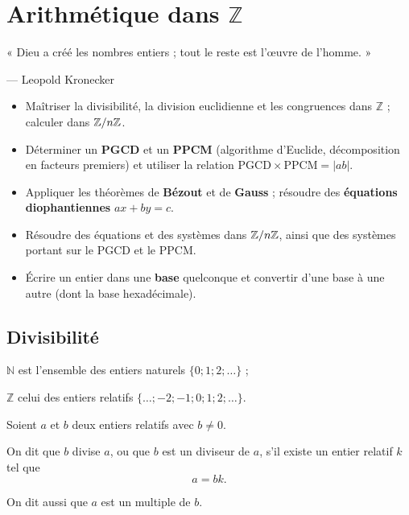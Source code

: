 \chapter{Arithmétique dans $\mathbb{Z}$}

\begin{citationchapitre}
	« Dieu a créé les nombres entiers ; tout le reste est l'œuvre de l'homme. »

	--- Leopold Kronecker
\end{citationchapitre}

\begin{objectifs}
	\begin{itemize}[label=\textbullet]
		\item Maîtriser la divisibilité, la division euclidienne et les
		congruences dans $\mathbb{Z}$ ; calculer dans $\mathbb{Z}/n\mathbb{Z}$.
		\item Déterminer un \textbf{PGCD} et un \textbf{PPCM} (algorithme
		d'Euclide, décomposition en facteurs premiers) et utiliser la relation
		$\mathrm{PGCD}\times\mathrm{PPCM} = |ab|$.
		\item Appliquer les théorèmes de \textbf{Bézout} et de \textbf{Gauss} ;
		résoudre des \textbf{équations diophantiennes} $ax + by = c$.
		\item Résoudre des équations et des systèmes dans $\mathbb{Z}/n\mathbb{Z}$, ainsi que
		des systèmes portant sur le PGCD et le PPCM.
		\item Écrire un entier dans une \textbf{base} quelconque et convertir
		d'une base à une autre (dont la base hexadécimale).
	\end{itemize}
\end{objectifs}


\section{Divisibilité}
$\mathbb N$ est l'ensemble des entiers naturels
$\{0;1;2;\ldots\}$ ;

$\mathbb Z$ celui des entiers relatifs
$\{\ldots;-2;-1;0;1;2;\ldots\}$.
	\begin{definition}

		Soient $a$ et $b$ deux entiers relatifs avec $b\neq 0$.

		On dit que $b$ divise $a$, ou que $b$ est un diviseur de $a$,
		s'il existe un entier relatif $k$ tel que
		$$
		a=bk.
		$$

		On dit aussi que $a$ est un multiple de $b$.

	\end{definition}

